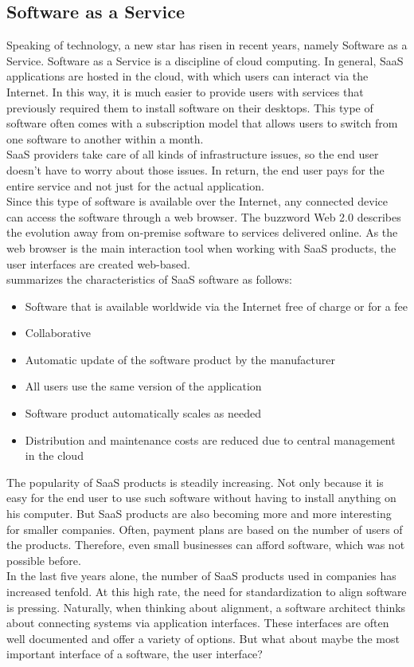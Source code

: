 \subsection{Software as a Service}

Speaking of technology, a new star has risen in recent years, namely Software as a Service. Software as a Service is a discipline of cloud computing. In general, SaaS applications are hosted in the cloud, with which users can interact via the Internet. In this way, it is much easier to provide users with services that previously required them to install software on their desktops. This type of software often comes with a subscription model that allows users to switch from one software to another within a month. \\
SaaS providers take care of all kinds of infrastructure issues, so the end user doesn't have to worry about those issues. In return, the end user pays for the entire service and not just for the actual application. \\
Since this type of software is available over the Internet, any connected device can access the software through a web browser. The buzzword Web 2.0 describes the evolution away from on-premise software to services delivered online. As the web browser is the main interaction tool when working with SaaS products, the user interfaces are created web-based. \cite{hill_guide_2013}\\
\citeauthor{hill_guide_2013} summarizes the characteristics of SaaS software as follows:
\begin{itemize}
    \item Software that is available worldwide via the Internet free of charge or for a fee
    \item Collaborative
    \item Automatic update of the software product by the manufacturer
    \item All users use the same version of the application
    \item Software product automatically scales as needed
    \item Distribution and maintenance costs are reduced due to central management in the cloud
\end{itemize}
The popularity of SaaS products is steadily increasing. Not only because it is easy for the end user to use such software without having to install anything on his computer. But SaaS products are also becoming more and more interesting for smaller companies. Often, payment plans are based on the number of users of the products. Therefore, even small businesses can afford software, which was not possible before. \cite{sury_software-as--service-modell_2020}\\
In the last five years alone, the number of SaaS products used in companies has increased tenfold. \cite{stastista_saas_2021} At this high rate, the need for standardization to align software is pressing. Naturally, when thinking about alignment, a software architect thinks about connecting systems via application interfaces. These interfaces are often well documented and offer a variety of options. But what about maybe the most important interface of a software, the user interface?